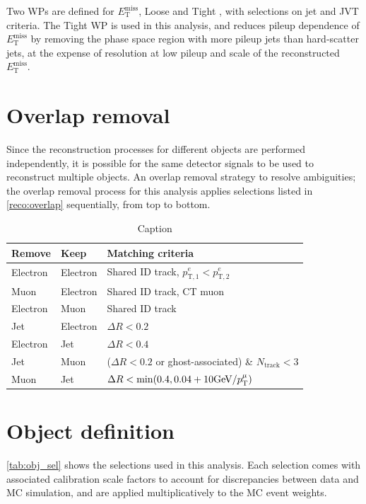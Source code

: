 \documentclass[../thesis.tex]{subfiles}
\begin{document}
Two WPs are defined for $E_\mathrm{T}^\mathrm{miss}$, Loose and Tight \citep{reco:met2}, with selections on jet \pT and JVT criteria. The Tight WP is used in this analysis, and reduces pileup dependence of $E_\mathrm{T}^\mathrm{miss}$ by removing the phase space region with more pileup jets than hard-scatter jets, at the expense of resolution at low pileup and scale of the reconstructed $E_\mathrm{T}^\mathrm{miss}$.

\section{Overlap removal}
Since the reconstruction processes for different objects are performed independently, it is possible for the same detector signals to be used to reconstruct multiple objects. An overlap removal strategy to resolve ambiguities; the overlap removal process for this analysis applies selections listed in \autoref{reco:overlap} sequentially, from top to bottom.

\begin{table}[!ht]
\centering
\caption[Caption]{\label{reco:overlap}Caption \citep{reco:overlap}}%
\begin{tabular}{lll}
\toprule
Remove		& Keep		& Matching criteria \\
\midrule
Electron	& Electron 	& Shared ID track, $p^e_\mathrm{T,1}<p^e_\mathrm{T,2}$ \\
Muon		& Electron	& Shared ID track, CT muon \\
Electron	& Muon		& Shared ID track \\
Jet			& Electron	& $\Delta R <0.2$ \\
Electron	& Jet		& $\Delta R <0.4$ \\
Jet			& Muon		& ($\Delta R <0.2$ or ghost-associated) \& $N_\text{track}<3$ \\
Muon		& Jet		& $\Delta R < \min(0.4, 0.04+10 \text{GeV/\ensuremath{p_\mathrm{T}^\mu}})$ \\
\bottomrule
\end{tabular}
\end{table}

\section{Object definition}
\label{sec:objdef}
\autoref{tab:obj_sel} shows the selections used in this analysis. Each selection comes with associated calibration scale factors to account for discrepancies between data and MC simulation, and are applied multiplicatively to the MC event weights.
\end{document}
